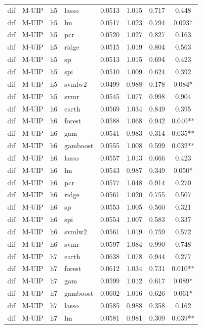 \begin{ThreePartTable}
\begin{longtable}[t]{llclcccc}
dif & M-UIP & h5 & lasso & 0.0513 & 1.015 & 0.717 & 0.448\\
dif & M-UIP & h5 & lm & 0.0517 & 1.023 & 0.794 & 0.093*\\
dif & M-UIP & h5 & pcr & 0.0520 & 1.027 & 0.827 & 0.163\\
dif & M-UIP & h5 & ridge & 0.0515 & 1.019 & 0.804 & 0.563\\
dif & M-UIP & h5 & sp & 0.0513 & 1.015 & 0.694 & 0.423\\
dif & M-UIP & h5 & spi & 0.0510 & 1.009 & 0.624 & 0.392\\
dif & M-UIP & h5 & svmlw2 & 0.0499 & 0.988 & 0.178 & 0.084*\\
dif & M-UIP & h5 & svmr & 0.0545 & 1.077 & 0.998 & 0.904\\
\addlinespace
dif & M-UIP & h6 & earth & 0.0569 & 1.034 & 0.849 & 0.395\\
dif & M-UIP & h6 & forest & 0.0588 & 1.068 & 0.942 & 0.040**\\
dif & M-UIP & h6 & gam & 0.0541 & 0.983 & 0.314 & 0.035**\\
dif & M-UIP & h6 & gamboost & 0.0555 & 1.008 & 0.599 & 0.032**\\
dif & M-UIP & h6 & lasso & 0.0557 & 1.013 & 0.666 & 0.423\\
dif & M-UIP & h6 & lm & 0.0543 & 0.987 & 0.349 & 0.050*\\
dif & M-UIP & h6 & pcr & 0.0577 & 1.048 & 0.914 & 0.270\\
dif & M-UIP & h6 & ridge & 0.0561 & 1.020 & 0.755 & 0.507\\
dif & M-UIP & h6 & sp & 0.0553 & 1.005 & 0.560 & 0.321\\
dif & M-UIP & h6 & spi & 0.0554 & 1.007 & 0.583 & 0.337\\
dif & M-UIP & h6 & svmlw2 & 0.0561 & 1.019 & 0.759 & 0.572\\
dif & M-UIP & h6 & svmr & 0.0597 & 1.084 & 0.990 & 0.748\\
\addlinespace
dif & M-UIP & h7 & earth & 0.0638 & 1.078 & 0.944 & 0.277\\
dif & M-UIP & h7 & forest & 0.0612 & 1.034 & 0.731 & 0.010**\\
dif & M-UIP & h7 & gam & 0.0599 & 1.012 & 0.617 & 0.089*\\
dif & M-UIP & h7 & gamboost & 0.0602 & 1.016 & 0.626 & 0.061*\\
dif & M-UIP & h7 & lasso & 0.0585 & 0.988 & 0.358 & 0.162\\
dif & M-UIP & h7 & lm & 0.0581 & 0.981 & 0.309 & 0.039**\\

\end{longtable}
\end{ThreePartTable}
